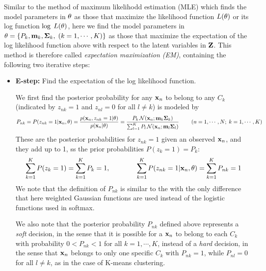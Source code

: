 \documentclass{article}
\begin{document}
Similar to the method of maximum likelihodd estimation (MLE) which 
finds the model parameters in ${\bf\theta}$ as those that maximize 
the likelihood function $L({\bf\theta})$ or its log function
$\log\;L({\bf\theta})$, here we find the model parameters in
$\theta =\{P_k,{\bf m}_k,{\bf\Sigma}_k,\;(k=1,\cdots,K)\}$ as those 
that maximize the expectation of the log likelihood function above
with respect to the latent variables in ${\bf Z}$. This method is 
therefore called {\em expectation maximization (EM)}, containing the 
following two iterative steps:
\begin{itemize}
\item {\bf E-step:} Find the expectation of the log likelihood function.
  
  We first find the posterior probability for any ${\bf x}_n$ to belong 
  to any $C_k$ (indicated by $z_{nk}=1$ and $z_{nl}=0$ for all $l\ne k$) 
  is modeled by
  \begin{equation}
    P_{nk}=P(z_{nk}=1|{\bf x}_n,\theta)
    =\frac{p({\bf x}_n,z_{nk}=1|\theta)}{p({\bf x}_n|\theta)}
    =\frac{P_k\,{\cal N}({\bf x}_n;{\bf m}_k{\bf\Sigma}_k)}
    {\sum_{l=1}^K P_l\,{\cal N}({\bf x}_n;{\bf m}_l{\bf\Sigma}_l)}
    \;\;\;\;\;\;\;\;(n=1,\cdots,N;\;k=1,\cdots,K)
    \label{GMMprob}
  \end{equation}
  These are the posterior probabilities for $z_{nk}=1$ given an observed
  ${\bf x}_n$, and they add up to 1, ss the prior probabilities 
  $P(z_k=1)=P_k$:
  \begin{equation}
    \sum_{k=1}^K P(z_k=1)=\sum_{k=1}^K P_k=1,
    \;\;\;\;\;\;\;\;\;\;\;\;\;\;
    \sum_{k=1}^K P(z_{nk}=1|{\bf x}_n,\theta)=\sum_{k=1}^K P_{nk}=1
  \end{equation}
  We note that the definition of $P_{nk}$ is similar to the 
  with the only difference that here weighted Gaussian functions are 
  used instead of the logistic functions used in softmax.

  We also note that the posterior probability $P_{nk}$ defined above 
  represents a {\em soft} decision, in the sense that it is possible
  for a ${\bf x}_n$ to belong to each $C_k$ with probability $0<P_{nk}<1$
  for all $k=1,\cdots,K$, instead of a {\em hard} decision, in the sense 
  that ${\bf x}_n$ belongs to only one specific $C_k$ with $P_{nk}=1$, 
  while $P_{nl}=0$ for all $l\ne k$, as in the case of K-means clustering.


\end{itemize}
\end{document}
